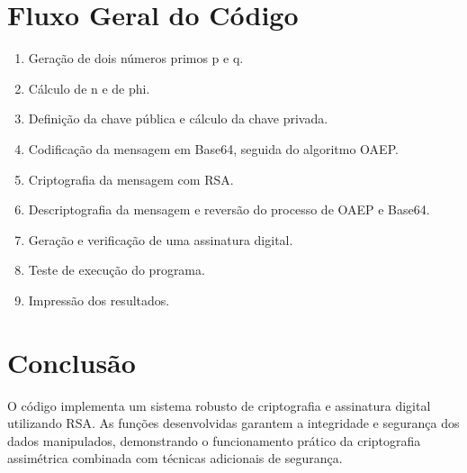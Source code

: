 \documentclass{article}
\begin{document}
\section{Fluxo Geral do Código}

\begin{enumerate}
    \item Geração de dois números primos p e q.
    \item Cálculo de n e de phi.
    \item Definição da chave pública e cálculo da chave privada.
    \item Codificação da mensagem em Base64, seguida do algoritmo OAEP.
    \item Criptografia da mensagem com RSA.
    \item Descriptografia da mensagem e reversão do processo de OAEP e Base64.
    \item Geração e verificação de uma assinatura digital.
    \item Teste de execução do programa.
    \item Impressão dos resultados.
\end{enumerate}

\section{Conclusão}
O código implementa um sistema robusto de criptografia e assinatura digital utilizando RSA. As funções desenvolvidas garantem a integridade e segurança dos dados manipulados, demonstrando o funcionamento prático da criptografia assimétrica combinada com técnicas adicionais de segurança.
\end{document}

